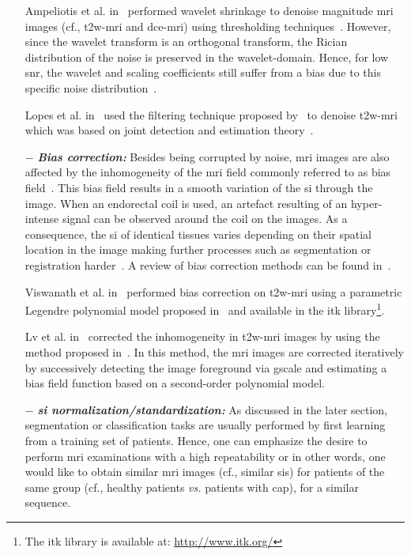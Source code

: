 \begin{enumerate}[leftmargin=*]
  Ampeliotis et al. in~\cite{Ampeliotis2007,Ampeliotis2008} performed wavelet shrinkage to denoise magnitude \ac{mri} images (cf., \ac{t2w}-\ac{mri} and \ac{dce}-\ac{mri}) using thresholding techniques~\cite{Mallat2008}. However, since the wavelet transform is an orthogonal transform, the Rician distribution of the noise is preserved in the wavelet-domain. Hence, for low \ac{snr}, the wavelet and scaling coefficients still suffer from a bias due to this specific noise distribution~\cite{Nowak1999}. 

  Lopes et al. in~\cite{Lopes2011} used the filtering technique proposed by~\cite{Pizurica2003} to denoise \ac{t2w}-\ac{mri} which was based on joint detection and estimation theory~\cite{Middleton1968}.

\item[$-$] \textbf{\textit{Bias correction:}} Besides being corrupted by noise, \ac{mri} images are also affected by the inhomogeneity of the \ac{mri} field commonly referred to as bias field~\cite{Styner2000}. This bias field results in a smooth variation of the \ac{si} through the image. When an endorectal coil is used, an artefact resulting of an hyper-intense signal can be observed around the coil on the images. As a consequence, the \ac{si} of identical tissues varies depending on their spatial location in the image making further processes such as segmentation or registration harder~\cite{Jungke1987,Vovk2007}. A review of bias correction methods can be found in~\cite{Vovk2007}.

  Viswanath et al. in~\cite{Viswanath2009} performed bias correction on \ac{t2w}-\ac{mri} using a parametric Legendre polynomial model proposed in~\cite{Styner2000} and available in the \ac{itk} library\footnote{The \ac{itk} library is available at: \url{http://www.itk.org/}}.

  Lv et al. in~\cite{Lv2009} corrected the inhomogeneity in \ac{t2w}-\ac{mri} images by using the method proposed in~\cite{Madabhushi2006}. In this method, the \ac{mri} images are corrected iteratively by successively detecting the image foreground via \ac{gscale} and estimating a bias field function based on a second-order polynomial model.

\item[$-$] \textbf{\textit{\Ac{si} normalization/standardization:}} As discussed in the later section, segmentation or classification tasks are usually performed by first learning from a training set of patients. Hence, one can emphasize the desire to perform \ac{mri} examinations with a high repeatability or in other words, one would like to obtain similar \ac{mri} images (cf., similar \acp{si}) for patients of the same group (cf., healthy patients \textit{vs.} patients with \ac{cap}), for a similar sequence.


\end{enumerate}
